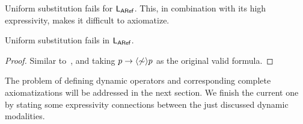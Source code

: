\medskip

Uniform substitution fails for $\mathsf{L_{ARef}}$. This, in combination with its high expressivity, makes it difficult to axiomatize.

\medskip

\begin{proposition}\label{prop:substitution-aref}
    Uniform substitution fails in $\mathsf{L_{ARef}}$.
\end{proposition}

\begin{proof}
Similar to~, and taking $p\to\langle \not\sim \rangle p$ as the original valid formula.
\end{proof}

The problem of defining dynamic operators and corresponding complete axiomatizations will be addressed in the next section. 
We finish the current one by stating some expressivity connections between the just discussed dynamic modalities.

\medskip


